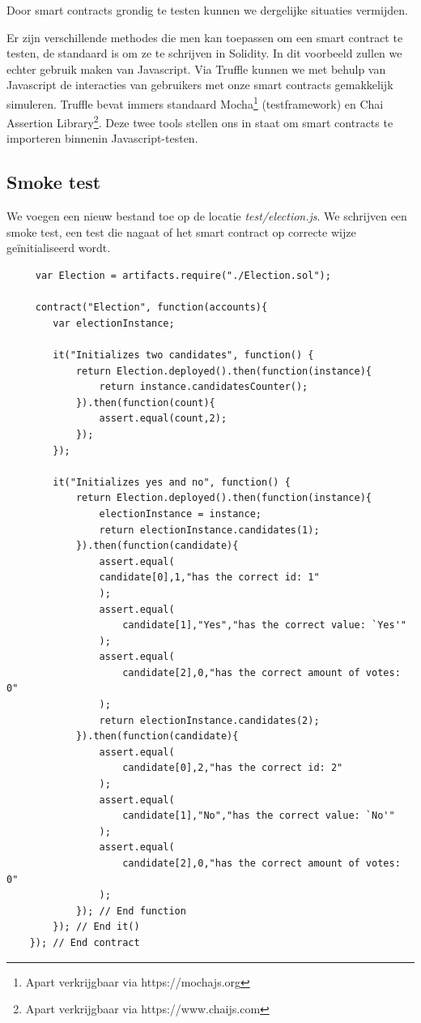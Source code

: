 	Door smart contracts grondig te testen kunnen we dergelijke situaties vermijden.
	
	Er zijn verschillende methodes die men kan toepassen om een smart contract te testen, de standaard is om ze te schrijven in Solidity. In dit voorbeeld zullen we echter gebruik maken van Javascript. Via Truffle kunnen we met behulp van Javascript de interacties van gebruikers met onze smart contracts gemakkelijk simuleren. Truffle bevat immers standaard Mocha\footnote{Apart verkrijgbaar via https://mochajs.org} (testframework) en Chai Assertion Library\footnote{Apart verkrijgbaar via https://www.chaijs.com}. Deze twee tools stellen ons in staat om smart contracts te importeren binnenin Javascript-testen. 
	
	\subsection{Smoke test}
	We voegen een nieuw bestand toe op de locatie \textit{test\slash election.js}. We schrijven een smoke test, een test die nagaat of het smart contract op correcte wijze geïnitialiseerd wordt.

	 \lstset{language=JavaScriptSolidity} 
	 \begin{lstlisting}
	 var Election = artifacts.require("./Election.sol");
	 	
	 contract("Election", function(accounts){
		var electionInstance;
		 
		it("Initializes two candidates", function() {
		 	return Election.deployed().then(function(instance){
		 		return instance.candidatesCounter();
		 	}).then(function(count){
		 		assert.equal(count,2);
		 	});
	 	});
	 	
		it("Initializes yes and no", function() {
	 		return Election.deployed().then(function(instance){
	 			electionInstance = instance;
	 			return electionInstance.candidates(1);
	 		}).then(function(candidate){
				assert.equal(
			 	candidate[0],1,"has the correct id: 1"
			 	);
				assert.equal(
				 	candidate[1],"Yes","has the correct value: `Yes'"
				);
				assert.equal(
				 	candidate[2],0,"has the correct amount of votes: 0"
				);
				return electionInstance.candidates(2);
	 		}).then(function(candidate){
				assert.equal(
					candidate[0],2,"has the correct id: 2"
				);
				assert.equal(
					candidate[1],"No","has the correct value: `No'"
				);
				assert.equal(
					candidate[2],0,"has the correct amount of votes: 0"
				);				
	 		}); // End function
	 	}); // End it()
	}); // End contract
	\end{lstlisting}
	
